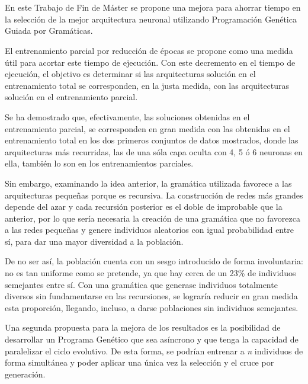 \documentclass[spanish,a4paper,12pt,twoside]{report}
\begin{document}
  \chapter*{\vspace{-3cm}{\LARGE 7. Conclusiones y líneas futuras}}
  \setcounter{figure}{24}
  \vspace{-1cm}
  En este Trabajo de Fin de Máster se propone una mejora para ahorrar tiempo en la selección de la mejor arquitectura neuronal utilizando Programación Genética Guiada por Gramáticas. \par
  El entrenamiento parcial por reducción de épocas se propone como una medida útil para acortar este tiempo de ejecución. Con este decremento en el tiempo de ejecución, el objetivo es determinar si las arquitecturas solución en el entrenamiento total se corresponden, en la justa medida, con las arquitecturas solución en el entrenamiento parcial. \par
  Se ha demostrado que, efectivamente, las soluciones obtenidas en el entrenamiento parcial, se corresponden en gran medida con las obtenidas en el entrenamiento total en los dos primeros conjuntos de datos mostrados, donde las arquitecturas más recurridas, las de una sóla capa oculta con 4, 5 ó 6 neuronas en ella, también lo son en los entrenamientos parciales. \par
  Sin embargo, examinando la idea anterior, la gramática utilizada favorece a las arquitecturas pequeñas porque es recursiva. La construcción de redes más grandes depende del azar y cada recursión posterior es el doble de improbable que la anterior, por lo que sería necesaria la creación de una gramática que no favorezca a las redes pequeñas y genere individuos aleatorios con igual probabilidad entre sí, para dar una mayor diversidad a la población. \par
  De no ser así, la población cuenta con un sesgo introducido de forma involuntaria: no es tan uniforme como se pretende, ya que hay cerca de un 23\% de individuos semejantes entre sí. Con una gramática que generase individuos totalmente diversos sin fundamentarse en las recursiones, se lograría reducir en gran medida esta proporción, llegando, incluso, a darse poblaciones sin individuos semejantes.  \par
  Una segunda propuesta para la mejora de los resultados es la posibilidad de desarrollar un Programa Genético que sea asíncrono y que tenga la capacidad de paralelizar el ciclo evolutivo. De esta forma, se podrían entrenar a \emph{n} individuos de forma simultánea y poder aplicar una única vez la selección y el cruce por generación.
  
\end{document}
